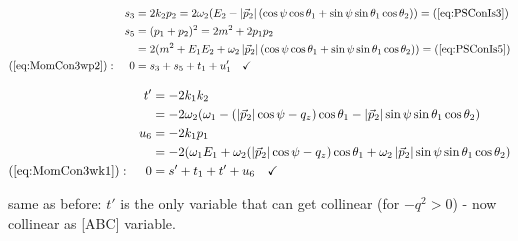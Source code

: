 \begin{align}
&&s_3 &= 2k_2p_2 = 2\omega_2(E_2-\left|\vec p_2\right|(\cos\psi\cos\theta_1+\sin\psi\sin\theta_1\cos\theta_2)) = (\ref{eq:PSConIs3})\\
&&s_5 &= (p_1+p_2)^2 = 2m^2+2p_1p_2\\
&& &= 2(m^2+E_1E_2+\omega_2\left|\vec p_2\right|(\cos\psi\cos\theta_1+\sin\psi\sin\theta_1\cos\theta_2)) = (\ref{eq:PSConIs5})\\
(\ref{eq:MomCon3wp2}): &&0 &= s_3+s_5+t_1+u_1'\quad\checkmark
\end{align}


\begin{align}
&&t' &= -2k_1k_2\\
 &&&= -2\omega_2(\omega_1 - (\left|\vec p_2\right|\cos\psi-q_z)\cos\theta_1 - \left|\vec p_2\right|\sin\psi\sin\theta_1\cos\theta_2)\\
&&u_6 &= - 2k_1p_1\\
 &&&= -2(\omega_1 E_1 + \omega_2(\left|\vec p_2\right|\cos\psi-q_z)\cos\theta_1 + \omega_2\left|\vec p_2\right|\sin\psi\sin\theta_1\cos\theta_2)\\
(\ref{eq:MomCon3wk1}): &&0 &= s'+t_1+t'+u_6\quad\checkmark
\end{align}

same as before: $t'$ is the only variable that can get collinear (for $-q^2 > 0$) - now collinear as [ABC] variable.
